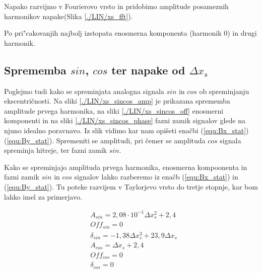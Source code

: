 
Napako razvijmo v Fourierovo vrsto in pridobimo amplitude posameznih harmonikov napake(Slika \ref{./LIN/xs_fft}).

Po pri"cakovanjih najbolj izstopata enosmerna komponenta (harmonik 0) in drugi harmonik.
\newpage
\subsection{Sprememba $sin$, $cos$ ter napake od $\Delta x_s$}

Poglejmo tudi kako se spreminjata analogna signala $sin$ in $cos$ ob spreminjanju ekscentričnosti. Na sliki \ref{./LIN/xs_sincos_amp} je prikazana sprememba amplitude prvega harmonika, na sliki \ref{./LIN/xs_sincos_off} enosmerni komponenti in na sliki \ref{./LIN/xs_sincos_phase} fazni zamik signalov glede na njuno idealno poravnavo. Iz slik vidimo kar nam opišeti enačbi (\ref{equ:Bx_stat})(\ref{equ:By_stat}). Spremeniti se amplitudi, pri čemer se amplituda $cos$ signala spreminja hitreje, ter fazni zamik $sin$.



Kako se spreminjajo amplituda prvega harmonika, enosmerna kompoonenta in fazni zamik $sin$ in $cos$ signalov lahko razberemo iz enačb (\ref{equ:Bx_stat}) in (\ref{equ:By_stat}). Tu poteke razvijem v Taylorjevo vrsto do tretje stopnje, kar bom lahko imel za primerjavo.

\begin{eqnarray}
&A_{sin} = 2,08 \cdot 10^{-1} \Delta x_s^2+2,4\\
&Off_{sin} = 0 \\
&\delta_{sin} =-1,38 \Delta x_s^3+ 23,9 \Delta x_s  \\
&A_{cos} = \Delta x_s+2,4\\
&Off_{cos} = 0 \\
&\delta_{cos} = 0\\
\end{eqnarray}

